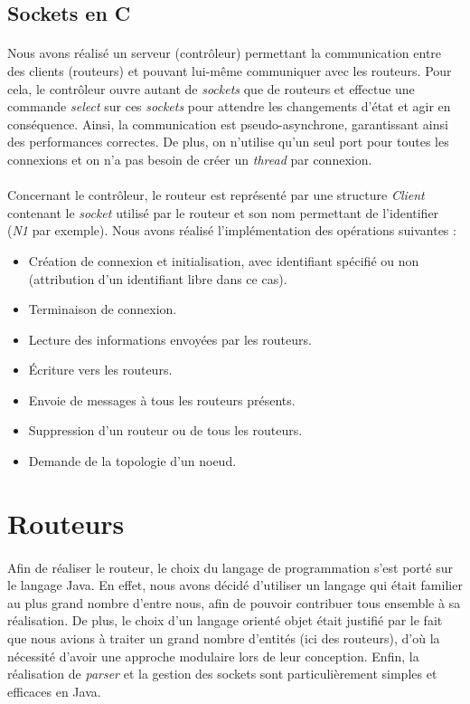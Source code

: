 \subsection{Sockets en C}
\paragraph{}Nous avons réalisé un serveur (contrôleur) permettant la communication
entre des clients (routeurs) et pouvant lui-même communiquer avec les
routeurs. Pour cela, le contrôleur ouvre autant de \textit{sockets} que de routeurs
et effectue une commande \textit{select} sur ces \textit{sockets} pour attendre les changements d'état et agir en conséquence. Ainsi, la communication est pseudo-asynchrone,
garantissant ainsi des performances correctes. De plus, on n'utilise qu'un
seul port pour toutes les connexions et on n'a pas besoin de créer un
\textit{thread} par connexion.
\paragraph{}Concernant le contrôleur, le routeur est représenté par une structure
\textit{Client} contenant le \textit{socket} utilisé par le routeur et son nom permettant de l'identifier (\textit{N1} par exemple).
\newpage
Nous avons réalisé l'implémentation des opérations suivantes : 
\begin{itemize}
\item Création de connexion et initialisation, avec identifiant spécifié ou non (attribution d'un identifiant libre dans ce cas).
\item Terminaison de connexion.
\item Lecture des informations envoyées par les routeurs.
\item Écriture vers les routeurs.
\item Envoie de messages à tous les routeurs présents.
\item Suppression d'un routeur ou de tous les routeurs.
\item Demande de la topologie d'un noeud.
\end{itemize}

\section{Routeurs}
\paragraph{}Afin de réaliser le routeur, le choix du langage de programmation s'est porté sur le langage Java. En effet, nous avons décidé d'utiliser un langage qui était familier au plus grand nombre d'entre nous, afin de pouvoir contribuer tous ensemble à sa réalisation. De plus, le choix d'un langage orienté objet était justifié par le fait que nous avions à traiter un grand nombre d'entités (ici des routeurs), d'où la nécessité d'avoir une approche modulaire lors de leur conception. Enfin, la réalisation de \textit{parser} et la gestion des sockets sont particulièrement simples et efficaces en Java. 

